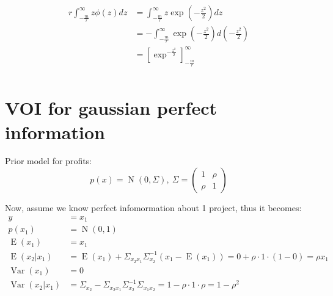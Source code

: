 \documentclass[11pt,a4paper]{article}
\begin{document}
\begin{equation*}
    \begin{split}
	r\int_{-\frac{m}{r}}^{\infty} z\phi(z)dz &=\int_{-\frac{m}{r}}^{\infty} z\exp(-\frac{z^2}{2})dz\\
	&=-\int_{-\frac{m}{r}}^{\infty}\exp(-\frac{z^2}{2})d(-\frac{z^2}{2})\\
	&= \left[\exp^{-\frac{z^2}{2}}\right]_{-\frac{m}{r}}^{\infty}\\
    \end{split}
\end{equation*}



\section*{VOI for gaussian perfect information}
Prior model for profits: 
\begin{equation}
	p(x) = \mathop{N}(0, \Sigma), \ \Sigma = 
	\begin{pmatrix}
	1 & \rho\\
	\rho & 1
	\end{pmatrix}
\end{equation}

Now, assume we know perfect infomormation about 1 project, thus it becomes:
\begin{equation}
	\begin{split}
	y &= x_1 \\
	p(x_1) &= \mathop{N}(0, 1)\\
	\mathop{E}(x_1) &= x_1 \\
	\mathop{E}(x_2|x_1) &= \mathop{E}(x_1) + \Sigma_{x_2x_1}\Sigma_{x_2}^{-1}(x_1 - \mathop{E}(x_1)) = 0 + \rho\cdot1\cdot(1-0)=\rho x_1\\
	\mathop{Var}(x_1) &=0\\
	\mathop{Var}(x_2|x_1) &= \Sigma_{x_2} - \Sigma_{x_2x_1}\Sigma_{x_2}^{-1}\Sigma_{x_1x_2} = 1 - \rho\cdot 1\cdot \rho = 1 - \rho^2\\
	\end{split}
\end{equation}
\end{document}
